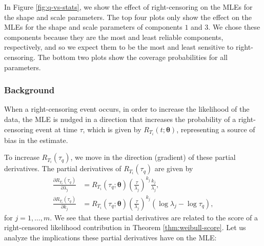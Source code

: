 \documentclass[
]{article}
\theoremstyle{definition}
\theoremstyle{plain}
\theoremstyle{definition}
\theoremstyle{definition}
\theoremstyle{definition}
\theoremstyle{definition}
\theoremstyle{remark}
\begin{document}
In Figure \ref{fig:q-vs-stats}, we show the effect of right-censoring on the
MLEs for the shape and scale parameters. The top four plots only show the effect
on the MLEs for the shape and scale parameters of components \(1\) and \(3\).
We chose these components because they are the most and least reliable
components, respectively, and so we expect them to be the most and least
sensitive to right-censoring. The bottom two plots show the coverage
probabilities for all parameters.

\hypertarget{background}{%
\subsubsection{Background}\label{background}}

When a right-censoring event occurs, in order to increase the likelihood of the data, the MLE
is nudged in a direction that increases the probability of a right-censoring event at time \(\tau\),
which is given by \(R_{T_i}(t;\boldsymbol{\theta})\), representing a source of bias in the estimate.

To increase \(R_{T_i}(\tau_q)\), we move in the direction (gradient) of these partial derivatives.
The partial derivatives of \(R_{T_i}(\tau_q)\) are given by
\begin{align*}
\frac{\partial R_{T_i}(\tau_q)}{\partial \lambda_j} &= R_{T_i}(\tau_q;\boldsymbol{\theta}) \left(\frac{\tau}{\lambda_j}\right)^{k_j} \frac{k_j}{\lambda_j},\\
\frac{\partial R_{T_i}(\tau_q)}{\partial k_j}       &= R_{T_i}(\tau_q;\boldsymbol{\theta}) \left(\frac{\tau}{\lambda_j}\right)^{k_j} \left(\log \lambda_j - \log \tau_q\right),
\end{align*}
for \(j = 1, \ldots, m\). We see that these partial derivatives are related to the score of a right-censored likelihood contribution in
Theorem \ref{thm:weibull-score}. Let us analyze the implications these
partial derivatives have on the MLE:
\end{document}
